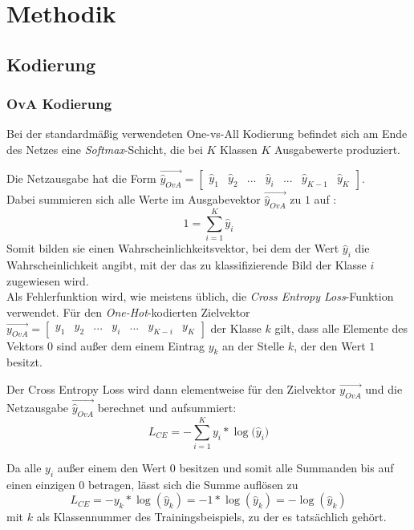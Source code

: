 \chapter{Methodik}
\label{ch:methodik}

\section{Kodierung}
\label{ch:methodik_kodierung}
\subsection{OvA Kodierung}
Bei der standardmäßig verwendeten One-vs-All Kodierung befindet sich am Ende des Netzes eine \textit{Softmax}-Schicht, die bei $K$ Klassen $K$ Ausgabewerte produziert.

Die Netzausgabe hat die Form $\overrightarrow{\widehat{y}_{OvA}} = \begin{bmatrix}
\widehat{y}_1 & \widehat{y}_2 & ... & \widehat{y}_i & ... & \widehat{y}_{K-1} & \widehat{y}_K
\end{bmatrix} $.\\

Dabei summieren sich alle Werte im Ausgabevektor $\overrightarrow{\widehat{y}_{OvA}}$ zu $1$ auf :
\[1 = \sum_{i=1}^K{\widehat{y}_i}\]
Somit bilden sie einen Wahrscheinlichkeitsvektor, bei dem der Wert $\widehat{y}_i$ die Wahrscheinlichkeit angibt, mit der das zu klassifizierende Bild der Klasse $i$ zugewiesen wird.\\

Als Fehlerfunktion wird, wie meistens üblich, die \textit{Cross Entropy Loss}-Funktion verwendet. Für den \textit{One-Hot}-kodierten Zielvektor \\
$\overrightarrow{y_{OvA}} = \begin{bmatrix} y_1 & y_2 & ... & y_i & ... & y_{K-i} & y_K \end{bmatrix}$ der Klasse $k$ gilt, dass alle Elemente des Vektors $0$ sind außer dem einem Eintrag $y_k$ an der Stelle $k$, der den Wert $1$ besitzt.


Der Cross Entropy Loss wird dann elementweise für den Zielvektor $\overrightarrow{y_{OvA}}$ und die Netzausgabe $\overrightarrow{\widehat{y}_{OvA}}$ berechnet und aufsummiert:
\[L_{CE} = - \sum_{i=1}^K{y_i * \log{(\widehat{y}_i})}\]

Da alle $y_i$ außer einem den Wert $0$ besitzen und somit alle Summanden bis auf einen einzigen $0$ betragen, lässt sich die Summe auflösen zu 
\[L_{CE} = - y_k * \log{(\widehat{y}_k)} = -1 * \log{(\widehat{y}_k)} = - \log{(\widehat{y}_k)}\]
mit $k$ als Klassennummer des Trainingsbeispiels, zu der es tatsächlich gehört.

